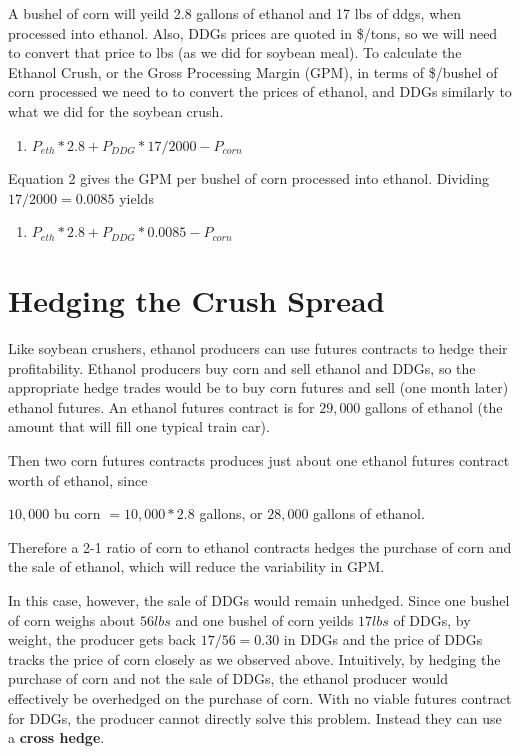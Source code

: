 \documentclass[]{book}
\providecommand{\tightlist}{%
  \setlength{\itemsep}{0pt}\setlength{\parskip}{0pt}}
\theoremstyle{definition}
\theoremstyle{definition}
\theoremstyle{remark}
\begin{document}
A bushel of corn will yeild 2.8 gallons of ethanol and 17 lbs of ddgs,
when processed into ethanol. Also, DDGs prices are quoted in \$/tons, so
we will need to convert that price to lbs (as we did for soybean meal).
To calculate the Ethanol Crush, or the Gross Processing Margin (GPM), in
terms of \$/bushel of corn processed we need to to convert the prices of
ethanol, and DDGs similarly to what we did for the soybean crush.

\begin{enumerate}
\def\labelenumi{\arabic{enumi}.}
\setcounter{enumi}{1}
\tightlist
\item
  \(P_{eth}*2.8 + P_{DDG}*17/2000 - P_{corn}\)
\end{enumerate}

Equation 2 gives the GPM per bushel of corn processed into ethanol.
Dividing \(17/2000 = 0.0085\) yields

\begin{enumerate}
\def\labelenumi{\arabic{enumi}.}
\setcounter{enumi}{2}
\tightlist
\item
  \(P_{eth}*2.8 + P_{DDG}*0.0085 - P_{corn}\)
\end{enumerate}

\section{Hedging the Crush Spread}\label{hedging-the-crush-spread}

Like soybean crushers, ethanol producers can use futures contracts to
hedge their profitability. Ethanol producers buy corn and sell ethanol
and DDGs, so the appropriate hedge trades would be to buy corn futures
and sell (one month later) ethanol futures. An ethanol futures contract
is for \(29,000\) gallons of ethanol (the amount that will fill one
typical train car).

Then two corn futures contracts produces just about one ethanol futures
contract worth of ethanol, since

\(10,000\) bu corn \(= 10,000*2.8\) gallons, or \(28,000\) gallons of
ethanol.

Therefore a 2-1 ratio of corn to ethanol contracts hedges the purchase
of corn and the sale of ethanol, which will reduce the variability in
GPM.

In this case, however, the sale of DDGs would remain unhedged. Since one
bushel of corn weighs about \(56lbs\) and one bushel of corn yeilds
\(17lbs\) of DDGs, by weight, the producer gets back \(17/56 = 0.30\) in
DDGs and the price of DDGs tracks the price of corn closely as we
observed above. Intuitively, by hedging the purchase of corn and not the
sale of DDGs, the ethanol producer would effectively be overhedged on
the purchase of corn. With no viable futures contract for DDGs, the
producer cannot directly solve this problem. Instead they can use a
\textbf{cross hedge}.
\end{document}
